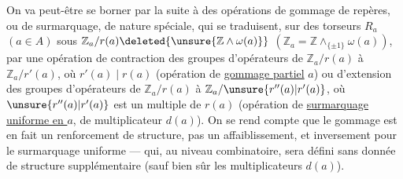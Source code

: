 
On va peut-être se borner par la suite à des opérations de gommage de repères, ou de surmarquage, de nature spéciale, qui se traduisent, sur  des torseurs $R_a$ $(a\in A)$  sous
$\mathbb Z_a/r(a)\deleted{\unsure{\mathbb Z\mathbin{\wedge}\omega(a)}}$
$(\mathbb Z_a=\mathbb Z\mathbin{\wedge}_{\{\pm1\}}\omega(a))$,
par une opération de contraction des groupes d'opérateurs de $\mathbb Z_a/r(a)$ à $\mathbb Z_a/r'(a)$, où $r'(a)\mid r(a)$
(opération de \uline{gommage partiel}   $a$)
ou d'extension des groupes d'opérateurs de $\mathbb Z_a/r(a)$ à $\mathbb Z_a/\unsure{r''(a)|r'(a)}$, où $\unsure{r''(a)|r'(a)}$  est un multiple de $r(a)$
(opération de \uline{surmarquage uniforme en $a$}, \deleted{)} de multiplicateur $d(a)$).
On se rend compte  que le gommage  est en fait un renforcement de structure, pas un affaiblissement, et inversement pour le surmarquage uniforme --- qui, au niveau combinatoire, sera défini sans donnée de structure supplémentaire (sauf bien sûr les multiplicateurs $d(a)$).
